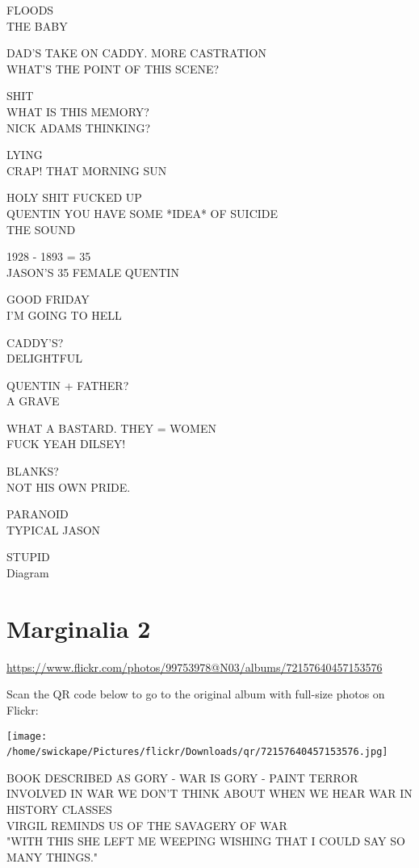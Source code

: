 \documentclass[10pt,letterpaper]{article}
\begin{document}
FLOODS\\
THE BABY

DAD'S TAKE ON CADDY.  MORE CASTRATION\\
WHAT'S THE POINT OF THIS SCENE?

SHIT\\
WHAT IS THIS MEMORY?\\
NICK ADAMS THINKING?

LYING\\
CRAP! THAT MORNING SUN

HOLY SHIT FUCKED UP\\
QUENTIN YOU HAVE SOME *IDEA* OF SUICIDE\\
THE SOUND

1928 {-} 1893 = 35\\
JASON'S 35 FEMALE QUENTIN

GOOD FRIDAY\\
I'M GOING TO HELL

CADDY'S?\\
DELIGHTFUL

QUENTIN + FATHER?\\
A GRAVE

WHAT A BASTARD.  THEY = WOMEN\\
FUCK YEAH DILSEY!

BLANKS?\\
NOT HIS OWN PRIDE.

PARANOID\\
TYPICAL JASON

STUPID\\
Diagram
\

\section*{Marginalia 2}

\url{https://www.flickr.com/photos/99753978@N03/albums/72157640457153576}

Scan the QR code below to go to the original album with full-size photos on Flickr:

\texttt{[image: /home/swickape/Pictures/flickr/Downloads/qr/72157640457153576.jpg]}
\

BOOK DESCRIBED AS GORY {-} WAR IS GORY {-} PAINT TERROR INVOLVED IN WAR WE DON'T THINK ABOUT WHEN WE HEAR WAR IN HISTORY CLASSES\\
VIRGIL REMINDS US OF THE SAVAGERY OF WAR\\
"WITH THIS SHE LEFT ME WEEPING WISHING THAT I COULD SAY SO MANY THINGS."
\end{document}
